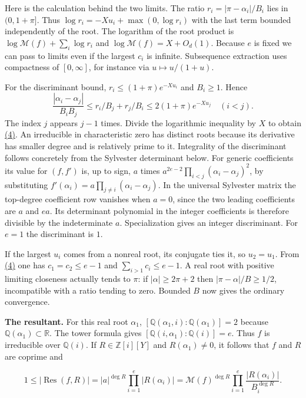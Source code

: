 \documentclass[11pt,a4paper]{article}
\begin{document}
Here is the calculation behind the two limits. The ratio \(r_i=|\pi-\alpha_i|/B_i\) lies in \((0,1+\pi]\). Thus \(\log r_i=-Xu_i+\max(0,\log r_i)\) with the last term bounded independently of the root. The logarithm of the root product is \(\log\mathcal M(f)+\sum_i\log r_i\) and \(\log\mathcal M(f)=X+O_d(1)\). Because \(e\) is fixed we can pass to limits even if the largest \(c_i\) is infinite. Subsequence extraction uses compactness of \([0,\infty]\), for instance via \(u\mapsto u/(1+u)\).

For the discriminant bound, \(r_i\le(1+\pi)e^{-Xu_i}\) and \(B_i\ge1\). Hence \[
 \frac{|\alpha_i-\alpha_j|}{B_iB_j}
 \le r_i/B_j+r_j/B_i\le2(1+\pi)e^{-Xu_j}\quad(i<j).
\] The index \(j\) appears \(j-1\) times. Divide the logarithmic inequality by \(X\) to obtain \hyperref[eq:4]{(4)}. An irreducible in characteristic zero has distinct roots because its derivative has smaller degree and is relatively prime to it. Integrality of the discriminant follows concretely from the Sylvester determinant below. For generic coefficients its value for \((f,f')\) is, up to sign, \(a\) times \(a^{2e-2}\prod_{i<j}(\alpha_i-\alpha_j)^2\), by substituting \(f'(\alpha_i)=a\prod_{j\ne i}(\alpha_i-\alpha_j)\). In the universal Sylvester matrix the top-degree coefficient row vanishes when \(a=0\), since the two leading coefficients are \(a\) and \(ea\). Its determinant polynomial in the integer coefficients is therefore divisible by the indeterminate \(a\). Specialization gives an integer discriminant. For \(e=1\) the discriminant is \(1\).

If the largest \(u_i\) comes from a nonreal root, its conjugate ties it, so \(u_2=u_1\). From \hyperref[eq:4]{(4)} one has \(c_1=c_2\le e-1\) and \(\sum_{i>1}c_i\le e-1\). A real root with positive limiting closeness actually tends to \(\pi\): if \(|\alpha|\ge2\pi+2\) then \(|\pi-\alpha|/B\ge1/2\), incompatible with a ratio tending to zero. Bounded \(B\) now gives the ordinary convergence.

\textbf{The resultant.} For this real root \(\alpha_1\), \([\mathbb Q(\alpha_1,i):\mathbb Q(\alpha_1)]=2\) because \(\mathbb Q(\alpha_1)\subset\mathbb R\). The tower formula gives \([\mathbb Q(i,\alpha_1):\mathbb Q(i)]=e\). Thus \(f\) is irreducible over \(\mathbb Q(i)\). If \(R\in\mathbb Z[i][Y]\) and \(R(\alpha_1)\ne0\), it follows that \(f\) and \(R\) are coprime and

\[
 1\le|\operatorname{Res}(f,R)|
 =|a|^{\deg R}\prod_{i=1}^e |R(\alpha_i)|
 =\mathcal M(f)^{\deg R}\prod_{i=1}^e
               \frac{|R(\alpha_i)|}{B_i^{\deg R}}.                         \tag{5}\label{eq:5}
\]
\end{document}

